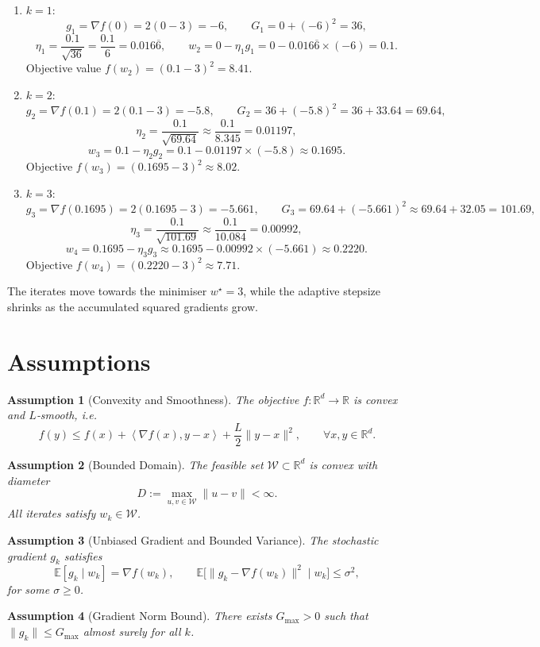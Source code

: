 \documentclass{article}
\newtheorem{assumption}{Assumption}
\newcommand{\E}{\mathbb{E}}
\newcommand{\R}{\mathbb{R}}
\newcommand{\iprod}[2]{\left\langle #1,#2\right\rangle}
\begin{document}
\begin{enumerate}[label=Iteration \arabic*:, leftmargin=*]
\item $k=1$:
\[
g_1=\nabla f(0)=2(0-3)=-6,\qquad
G_1=0+(-6)^2=36,
\]
\[
\eta_1=\frac{0.1}{\sqrt{36}}=\frac{0.1}{6}=0.016\overline{6},
\qquad
w_2=0-\eta_1 g_1=0-0.016\overline{6}\times(-6)=0.1.
\]
Objective value $f(w_2)=(0.1-3)^2=8.41$.

\item $k=2$:
\[
g_2=\nabla f(0.1)=2(0.1-3)=-5.8,\qquad
G_2=36+(-5.8)^2=36+33.64=69.64,
\]
\[
\eta_2=\frac{0.1}{\sqrt{69.64}}\approx\frac{0.1}{8.345}=0.01197,
\]
\[
w_3=0.1-\eta_2 g_2=0.1-0.01197\times(-5.8)\approx0.1695.
\]
Objective $f(w_3)=(0.1695-3)^2\approx8.02$.

\item $k=3$:
\[
g_3=\nabla f(0.1695)=2(0.1695-3)=-5.661,\qquad
G_3=69.64+(-5.661)^2\approx69.64+32.05=101.69,
\]
\[
\eta_3=\frac{0.1}{\sqrt{101.69}}\approx\frac{0.1}{10.084}=0.00992,
\]
\[
w_4=0.1695-\eta_3 g_3\approx0.1695-0.00992\times(-5.661)\approx0.2220.
\]
Objective $f(w_4)=(0.2220-3)^2\approx7.71$.

\end{enumerate}
The iterates move towards the minimiser $w^{\star}=3$, while the adaptive stepsize shrinks as the accumulated squared gradients grow.

\newpage
\section*{Assumptions}
\begin{assumption}[Convexity and Smoothness]\label{ass:convex}
The objective $f:\R^d\to\R$ is convex and $L$‑smooth, i.e.
\[
f(y)\le f(x)+\iprod{\nabla f(x)}{y-x}+\frac{L}{2}\|y-x\|^{2},
\qquad\forall x,y\in\R^d.
\]
\end{assumption}
\begin{assumption}[Bounded Domain]\label{ass:diameter}
The feasible set $\mathcal{W}\subset\R^d$ is convex with diameter
\[
D:=\max_{u,v\in\mathcal{W}}\|u-v\| <\infty .
\]
All iterates satisfy $w_k\in\mathcal{W}$.
\end{assumption}
\begin{assumption}[Unbiased Gradient and Bounded Variance]\label{ass:unbiased}
The stochastic gradient $g_k$ satisfies
\[
\E[g_k\mid w_k]=\nabla f(w_k),\qquad
\E\big[\|g_k-\nabla f(w_k)\|^{2}\mid w_k\big]\le\sigma^{2},
\]
for some $\sigma\ge0$.
\end{assumption}
\begin{assumption}[Gradient Norm Bound]\label{ass:bound}
There exists $G_{\max}>0$ such that $\|g_k\|\le G_{\max}$ almost surely for all $k$.
\end{assumption}
\end{document}
